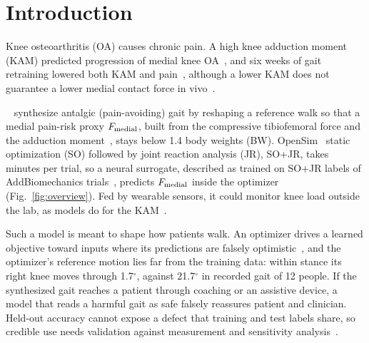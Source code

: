 \section{Introduction}\label{sec:intro}

Knee osteoarthritis (OA) causes chronic pain. A high knee adduction moment (KAM) predicted
progression of medial knee OA~\cite{miyazaki2002}, and six weeks of gait retraining lowered both
KAM and pain~\cite{shull2013six}, although a lower KAM does not guarantee a lower medial contact
force in vivo~\cite{walter2010}.

\Chong{}~\citeChong{} synthesize antalgic (pain-avoiding) gait by reshaping a reference walk so
that a medial pain-risk proxy $F_{\mathrm{medial}}$, built from the compressive tibiofemoral force and the
adduction moment~\cite{schipplein1991}, stays below 1.4 body weights (BW). OpenSim~\cite{delp2007}
static optimization (SO) followed by joint reaction analysis (JR), SO+JR, takes minutes per trial,
so a neural surrogate, described as trained on SO+JR labels of AddBiomechanics
trials~\cite{werling2024}, predicts $F_{\mathrm{medial}}$ inside the optimizer (Fig.~\ref{fig:overview}). Fed by wearable sensors, it
could monitor knee load outside the lab, as models do for the KAM~\cite{wang2020kam}.

Such a model is meant to shape how patients walk. An optimizer drives a learned objective toward inputs where its
predictions are falsely optimistic~\cite{trabucco2021}, and the optimizer's reference motion lies
far from the training data: within stance its right knee moves through 1.7$^\circ$, against
21.7$^\circ$ in recorded gait of 12 people. If the synthesized gait reaches a patient through
coaching or an assistive device, a model that reads a harmful gait as safe falsely reassures
patient and clinician. Held-out accuracy cannot expose a defect that training and test labels
share, so credible use needs validation against measurement and sensitivity
analysis~\cite{hicks2015}.


